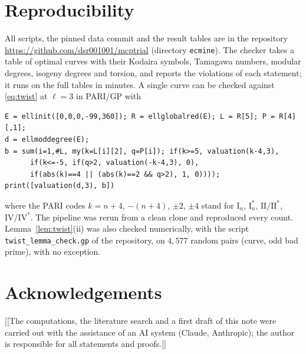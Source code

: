 \documentclass[11pt]{amsart}
\theoremstyle{definition}
\begin{document}
\section{Reproducibility}
All scripts, the pinned data commit and the result tables are in the repository \url{https://github.com/dsr001001/mcptrial} (directory \texttt{ecmine}). The checker takes a table of optimal curves with their Kodaira symbols, Tamagawa numbers, modular degrees, isogeny degrees and torsion, and reports the violations of each statement; it runs on the full tables in minutes. A single curve can be checked against \eqref{eq:twist} at $\ell=3$ in PARI/GP with
\begin{verbatim}
E = ellinit([0,0,0,-99,360]); R = ellglobalred(E); L = R[5]; P = R[4][,1];
d = ellmoddegree(E);
b = sum(i=1,#L, my(k=L[i][2], q=P[i]); if(k>=5, valuation(k-4,3),
      if(k<=-5, if(q>2, valuation(-k-4,3), 0),
      if(abs(k)==4 || (abs(k)==2 && q>2), 1, 0))));
print([valuation(d,3), b])
\end{verbatim}
where the PARI codes $k=n+4$, $-(n+4)$, $\pm2$, $\pm4$ stand for $\mathrm{I}_n$, $\mathrm{I}_n^*$, $\mathrm{II}/\mathrm{II}^*$, $\mathrm{IV}/\mathrm{IV}^*$. The pipeline was rerun from a clean clone and reproduced every count. Lemma~\ref{lem:twist}(ii) was also checked numerically, with the script \texttt{twist\_lemma\_check.gp} of the repository, on $4{,}577$ random pairs (curve, odd bad prime), with no exception.

\section*{Acknowledgements}
[[The computations, the literature search and a first draft of this note were carried out with the assistance of an AI system (Claude, Anthropic); the author is responsible for all statements and proofs.]]



\end{document}
